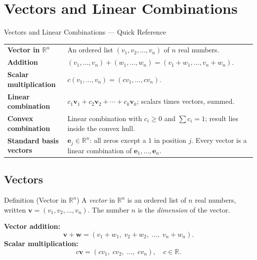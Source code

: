
\section{Vectors and Linear Combinations}

\begin{toolkitbox}{Vectors and Linear Combinations --- Quick Reference}
\begin{tabular}{@{}p{}p{}@{}}
\textbf{Vector in $\mathbb{R}^n$}     & An ordered list $(v_1, v_2, \ldots, v_n)$ of $n$ real numbers. \\[4pt]
\textbf{Addition}                      & $(v_1,\ldots,v_n)+(w_1,\ldots,w_n) = (v_1+w_1,\ldots,v_n+w_n)$. \\[4pt]
\textbf{Scalar multiplication}         & $c(v_1,\ldots,v_n) = (cv_1,\ldots,cv_n)$. \\[4pt]
\textbf{Linear combination}            & $c_1\mathbf{v}_1 + c_2\mathbf{v}_2 + \cdots + c_k\mathbf{v}_k$; scalars times vectors, summed. \\[4pt]
\textbf{Convex combination}            & Linear combination with $c_i \geq 0$ and $\sum c_i = 1$; result lies inside the convex hull. \\[4pt]
\textbf{Standard basis vectors}        & $\mathbf{e}_j \in \mathbb{R}^n$: all zeros except a $1$ in position $j$. Every vector is a linear combination of $\mathbf{e}_1,\ldots,\mathbf{e}_n$. \\
\end{tabular}
\end{toolkitbox}

\subsection*{Vectors}

\begin{propositionbox}{Definition (Vector in $\mathbb{R}^n$)}
A \emph{vector} in $\mathbb{R}^n$ is an ordered list of $n$ real numbers,
written $\mathbf{v} = (v_1, v_2, \ldots, v_n)$.
The number $n$ is the \emph{dimension} of the vector.

\medskip
\textbf{Vector addition:}
\[
  \mathbf{v} + \mathbf{w} = (v_1 + w_1,\; v_2 + w_2,\; \ldots,\; v_n + w_n).
\]
\textbf{Scalar multiplication:}
\[
  c\mathbf{v} = (cv_1,\; cv_2,\; \ldots,\; cv_n), \quad c \in \mathbb{R}.
\]
\end{propositionbox}

